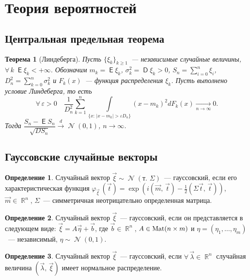 \documentclass[11pt]{article}
\theoremstyle{definition}\newtheorem*{definition}{Определение}
\theoremstyle{plain}\newtheorem{theorem}{Теорема}[subsection]
\DeclareMathOperator{\E}{\mathsf{E}}
\DeclareMathOperator{\D}{\mathsf{D}}
\DeclareMathOperator{\N}{\mathcal{N}}
\DeclareMathOperator{\Real}{\mathbb{R}}
\DeclareMathOperator{\Mat}{\text{\textnormal{Mat}}}
\begin{document}
    \section{Теория вероятностей}
    
    \subsection{Центральная предельная теорема}
    
    \begin{theorem}[Линдеберга]
        Пусть $\{\xi_k\}_{k \geqslant 1}$~--- независимые случайные величины, $\forall \, k \; \E \xi_k < +\infty$. Обозначим $m_k=\E \xi_k$, $\sigma_k^2 = \D \xi_k > 0$, $S_n=\sum \limits_{i=0}^n \xi_i$, $D_n^2 = \sum \limits_{k=0}^n \sigma_k^2$ и $F_k(x)$~--- функция распределения $\xi_k$. Пусть выполнено условие Линдеберга, то есть
        $$
            \forall \, \varepsilon > 0 \quad \frac{1}{D_n^2} \sum_{k=1}^{n} \int \limits_{\{x:\, \vert x - m_k \vert > \varepsilon D_n\}} (x-m_k)^2 dF_k(x) \xrightarrow[n\rightarrow \infty]{} 0.
        $$
        Тогда $\dfrac{S_n - \E S_n}{\sqrt{DS_n}} \overset{d}{\longrightarrow} \N (0, 1)$, $n\rightarrow \infty$.
    \end{theorem}
    
    \subsection{Гауссовские случайные векторы}
    
    \begin{definition}
        Случайный вектор $\vec \xi \sim \N(\text{т. }\Sigma)$~--- гауссовский, если его характеристическая функция $\varphi_{\vec \xi}\, (\vec t)=\exp (i(\vec m,\, \vec t)-\frac{1}{2}(\Sigma \vec t,\, \vec t))$, $\vec m \in \Real^n$, $\Sigma$~--- симметричная неотрицательно определенная матрица.
    \end{definition}
    
    \begin{definition}
        Случайный вектор $\vec \xi$~--- гауссовский, если он представляется в следующем виде: $\vec \xi = A\vec\eta + \vec b$, где $\vec b \in \Real^n$, $A \in \Mat(n \times m)$ и $\eta = (\eta_1, \ldots, \eta_m)$~--- независимый, $\eta \sim \N(0, 1)$.
    \end{definition}
    
    \begin{definition}
        Случайный вектор $\vec \xi$~--- гауссовский, если $\forall \, \vec \lambda \in \Real^n$ случайная величина $(\vec \lambda, \, \vec \xi)$ имеет нормальное распределение.
    \end{definition}
    
\end{document}

